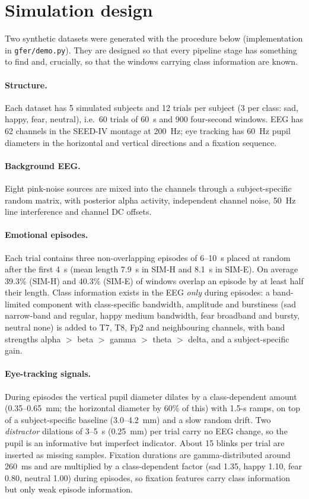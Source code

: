\section{Simulation design}
\label{sec:data}

Two synthetic datasets were generated with the procedure below (implementation in \texttt{gfer/demo.py}). They are designed so that every pipeline stage has something to find and, crucially, so that the windows carrying class information are known.

\paragraph{Structure.} Each dataset has 5 simulated subjects and 12 trials per subject (3 per class: sad, happy, fear, neutral), i.e.\ 60 trials of 60~s and 900 four-second windows. EEG has 62 channels in the SEED-IV montage at 200~Hz; eye tracking has 60~Hz pupil diameters in the horizontal and vertical directions and a fixation sequence.

\paragraph{Background EEG.} Eight pink-noise sources are mixed into the channels through a subject-specific random matrix, with posterior alpha activity, independent channel noise, 50~Hz line interference and channel DC offsets.

\paragraph{Emotional episodes.} Each trial contains three non-overlapping episodes of 6--10~s placed at random after the first 4~s (mean length 7.9~s in SIM-H and 8.1~s in SIM-E). On average 39.3\% (SIM-H) and 40.3\% (SIM-E) of windows overlap an episode by at least half their length. Class information exists in the EEG \emph{only} during episodes: a band-limited component with class-specific bandwidth, amplitude and burstiness (sad narrow-band and regular, happy medium bandwidth, fear broadband and bursty, neutral none) is added to T7, T8, Fp2 and neighbouring channels, with band strengths alpha $>$ beta $>$ gamma $>$ theta $>$ delta, and a subject-specific gain.

\paragraph{Eye-tracking signals.} During episodes the vertical pupil diameter dilates by a class-dependent amount (0.35--0.65~mm; the horizontal diameter by 60\% of this) with 1.5-s ramps, on top of a subject-specific baseline (3.0--4.2~mm) and a slow random drift. Two \emph{distractor} dilations of 3--5~s (0.25~mm) per trial carry no EEG change, so the pupil is an informative but imperfect indicator. About 15 blinks per trial are inserted as missing samples. Fixation durations are gamma-distributed around 260~ms and are multiplied by a class-dependent factor (sad 1.35, happy 1.10, fear 0.80, neutral 1.00) during episodes, so fixation features carry class information but only weak episode information.

